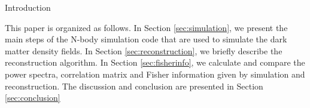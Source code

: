 \begin{section}{Introduction}

  This paper is organized as follows. 
  In Section \ref{sec:simulation}, we present the main steps of the N-body simulation code that are used to simulate the dark matter density fields.
  In Section \ref{sec:reconstruction}, we briefly describe the reconstruction algorithm.
  In Section \ref{sec:fisherinfo}, we calculate and compare the power spectra, correlation matrix and Fisher information given by simulation and reconstruction.
  The discussion and conclusion are presented in Section \ref{sec:conclusion}

\end{section}
